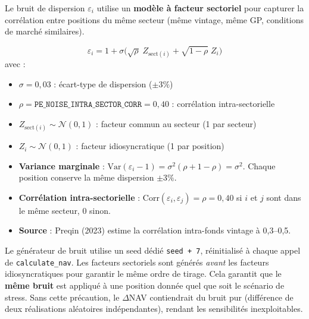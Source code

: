 \documentclass[12pt,a4paper]{article}
\begin{document}
Le bruit de dispersion $\varepsilon_i$ utilise un \textbf{mod\`{e}le \`{a} facteur sectoriel}
pour capturer la corr\'{e}lation entre positions du m\^{e}me secteur (m\^{e}me vintage,
m\^{e}me GP, conditions de march\'{e} similaires).

\begin{formulebox}
\begin{equation}
\label{eq:noise_factor}
\varepsilon_i = 1 + \sigma \bigl(\sqrt{\rho}\; Z_{\mathrm{sect}(i)} + \sqrt{1 - \rho}\; Z_i\bigr)
\end{equation}
avec :
\begin{itemize}[nosep]
    \item $\sigma = 0{,}03$ : \'{e}cart-type de dispersion ($\pm 3\%$)
    \item $\rho = \texttt{PE\_NOISE\_INTRA\_SECTOR\_CORR} = 0{,}40$ : corr\'{e}lation intra-sectorielle
    \item $Z_{\mathrm{sect}(i)} \sim \mathcal{N}(0, 1)$ : facteur commun au secteur (1 par secteur)
    \item $Z_i \sim \mathcal{N}(0, 1)$ : facteur idiosyncratique (1 par position)
\end{itemize}
\end{formulebox}

\begin{interpretbox}
\begin{itemize}[nosep]
    \item \textbf{Variance marginale} : $\mathrm{Var}(\varepsilon_i - 1) = \sigma^2 (\rho + 1 - \rho) = \sigma^2$. Chaque position conserve la m\^{e}me dispersion $\pm 3\%$.
    \item \textbf{Corr\'{e}lation intra-sectorielle} : $\mathrm{Corr}(\varepsilon_i, \varepsilon_j) = \rho = 0{,}40$ si $i$ et $j$ sont dans le m\^{e}me secteur, 0 sinon.
    \item \textbf{Source} : Preqin (2023) estime la corr\'{e}lation intra-fonds vintage \`{a} 0{,}3--0{,}5.
\end{itemize}
\end{interpretbox}

\begin{warningbox}
Le g\'{e}n\'{e}rateur de bruit utilise un seed d\'{e}di\'{e} \texttt{seed + 7}, r\'{e}initialis\'{e} \`{a} chaque appel
de \texttt{calculate\_nav}. Les facteurs sectoriels sont g\'{e}n\'{e}r\'{e}s \textit{avant} les facteurs
idiosyncratiques pour garantir le m\^{e}me ordre de tirage.
Cela garantit que le \textbf{m\^{e}me bruit} est appliqu\'{e}
\`{a} une position donn\'{e}e quel que soit le sc\'{e}nario de stress.
Sans cette pr\'{e}caution, le $\Delta$NAV contiendrait du bruit pur (diff\'{e}rence de deux
r\'{e}alisations al\'{e}atoires ind\'{e}pendantes), rendant les sensibilit\'{e}s inexploitables.
\end{warningbox}
\end{document}
